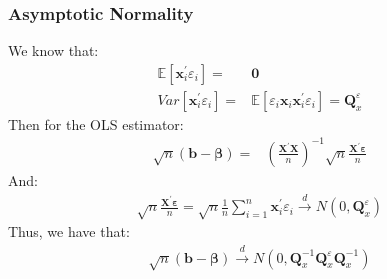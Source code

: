 \documentclass{article}
\begin{document}
\subsubsection{Asymptotic Normality}
We know that:
	\begin{align*}
		\mathbb{E} [\boldsymbol{x}^\prime_i \varepsilon_i] = &\boldsymbol{0}\\
		Var[ \boldsymbol{x}^\prime_i \varepsilon_i] = & \mathbb{E} [\varepsilon_i \boldsymbol{x}_i \boldsymbol{x}^\prime_i \varepsilon_i] = \boldsymbol{Q}^\varepsilon_x
	\end{align*}
Then for the OLS estimator:
	\begin{align*}
		\sqrt{n}( \boldsymbol{b} - \boldsymbol{\beta} ) = & ( \frac{\boldsymbol{X}^\prime \boldsymbol{X}}{n} )^{-1} \sqrt{n} \frac{\boldsymbol{X}^\prime \boldsymbol{\varepsilon}}{n}
	\end{align*}
And:
	\begin{align*}
		\sqrt{n} \frac{\boldsymbol{X}^\prime \boldsymbol{\varepsilon}}{n} = \sqrt{n} \frac{1}{n} \sum^n_{i=1} \boldsymbol{x}^\prime_i \varepsilon_i \xrightarrow{d} N(0, \boldsymbol{Q}^\varepsilon_x)
	\end{align*}
Thus, we have that:
	\begin{align*}
		\sqrt{n}( \boldsymbol{b} - \boldsymbol{\beta} ) \xrightarrow{d} N(0, \boldsymbol{Q}^{-1}_x \boldsymbol{Q}^\varepsilon_x \boldsymbol{Q}^{-1}_x)
	\end{align*}
\end{document}
